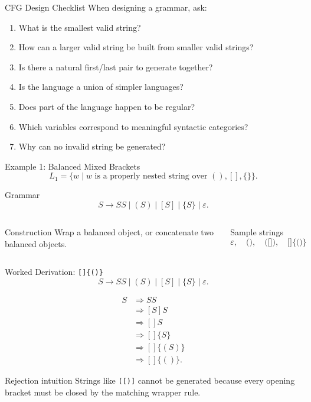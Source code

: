 \documentclass[aspectratio=169,10pt]{beamer}
\newcommand{\eps}{\varepsilon}
\newcommand{\der}{\Rightarrow}
\newcommand{\code}[1]{\texttt{#1}}
\begin{document}
\begin{frame}{CFG Design Checklist}
\small
When designing a grammar, ask:

\begin{enumerate}
    \item What is the smallest valid string?
    \item How can a larger valid string be built from smaller valid strings?
    \item Is there a natural first/last pair to generate together?
    \item Is the language a union of simpler languages?
    \item Does part of the language happen to be regular?
    \item Which variables correspond to meaningful syntactic categories?
    \item Why can no invalid string be generated?
\end{enumerate}
\end{frame}

\begin{frame}{Example 1: Balanced Mixed Brackets}
\small
\[
L_1=\{w\mid w\text{ is a properly nested string over }(),[],\{\}\}.
\]

\begin{exampleblock}{Grammar}
\[
S\to SS\mid (S)\mid [S]\mid \{S\}\mid\eps.
\]
\end{exampleblock}

\vspace{0.7em}
\begin{columns}[T,onlytextwidth]
\begin{block}{Construction}
Wrap a balanced object, or concatenate two balanced objects.
\end{block}

\begin{exampleblock}{Sample strings}
\[
\eps,\quad \code{()},\quad \code{([])},\quad \code{[]\{()\}}
\]
\end{exampleblock}
\end{columns}
\end{frame}

\begin{frame}{Worked Derivation: \code{[]\{()\}}}
\small
\[
S\to SS\mid (S)\mid [S]\mid \{S\}\mid\eps.
\]

\begin{align*}
S
&\der SS\\
&\der [S]S\\
&\der []S\\
&\der []\{S\}\\
&\der []\{(S)\}\\
&\der []\{()\}.
\end{align*}

\begin{alertblock}{Rejection intuition}
Strings like \code{([)]} cannot be generated because every opening bracket must be closed by the matching wrapper rule.
\end{alertblock}
\end{frame}
\end{document}
